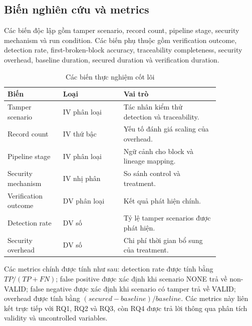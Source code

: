 \subsection{Biến nghiên cứu và metrics}

Các biến độc lập gồm tamper scenario, record count, pipeline stage, security mechanism và run condition. Các biến phụ thuộc gồm verification outcome, detection rate, first-broken-block accuracy, traceability completeness, security overhead, baseline duration, secured duration và verification duration.

\begin{table}[t]
\caption{Các biến thực nghiệm cốt lõi}
\centering
\begin{tabular}{p{0.22\linewidth}p{0.24\linewidth}p{0.38\linewidth}}
\toprule
\textbf{Biến} & \textbf{Loại} & \textbf{Vai trò} \\
\midrule
Tamper scenario & IV phân loại & Tác nhân kiểm thử detection và traceability. \\
Record count & IV thứ bậc & Yếu tố đánh giá scaling của overhead. \\
Pipeline stage & IV phân loại & Ngữ cảnh cho block và lineage mapping. \\
Security mechanism & IV nhị phân & So sánh control và treatment. \\
Verification outcome & DV phân loại & Kết quả phát hiện chính. \\
Detection rate & DV số & Tỷ lệ tamper scenarios được phát hiện. \\
Security overhead & DV số & Chi phí thời gian bổ sung của treatment. \\
\bottomrule
\end{tabular}
\label{tab:variables}
\end{table}

Các metrics chính được tính như sau: detection rate được tính bằng $TP/(TP+FN)$; false positive được xác định khi scenario NONE trả về non-VALID; false negative được xác định khi scenario có tamper trả về VALID; overhead được tính bằng $(secured-baseline)/baseline$. Các metrics này liên kết trực tiếp với RQ1, RQ2 và RQ3, còn RQ4 được trả lời thông qua phân tích validity và uncontrolled variables.
